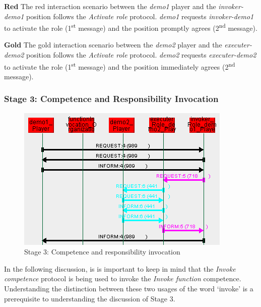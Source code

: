 \textbf{Red} The red interaction scenario between the \textit{demo1} player and the \textit{invoker-demo1} position follows the \textit{Activate role} protocol.
\textit{demo1} requests \textit{invoker-demo1} to activate the role (1\textsuperscript{st} message) and the position promptly agrees (2\textsuperscript{nd} message).

\textbf{Gold} The gold interaction scenario between the \textit{demo2} player and the \textit{executer-demo2} position follows the \textit{Activate role} protocol.
\textit{demo2} requests \textit{executer-demo2} to activate the role (1\textsuperscript{st} message) and the position immediately agrees (2\textsuperscript{nd} message).

\subsubsection*{Stage 3: Competence and Responsibility Invocation}

\begin{figure}[H]
	\centering
	\includegraphics[width=\textwidth]{images/example1-stage3.png}
	\caption{Stage 3: Competence and responsibility invocation}
	\label{figure:example1-stage3}
\end{figure}

In the following discussion, is is important to keep in mind that the \textit{Invoke competence} protocol is being used to invoke the \textit{Invoke function} competence.
Understanding the distinction between these two usages of the word `invoke' is a prerequisite to understanding the discussion of Stage 3.


